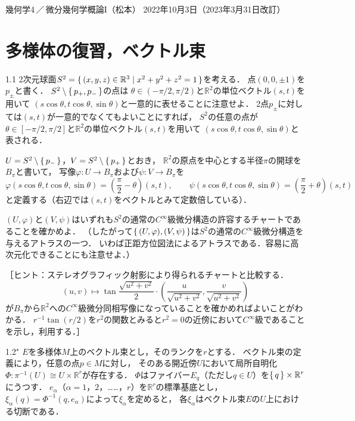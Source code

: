 \documentclass[uplatex,dvipdfmx,fontsize=12pt,jafontsize=11pt,line_length=42zw,number_of_lines=36,hanging_punctuation]{jlreq}
\begin{document}
\begin{flushleft}
	幾何学4\,／\,微分幾何学概論I（松本）
	\hfill
	2022年10月3日（2023年3月31日改訂）
\end{flushleft}
\section{多様体の復習，ベクトル束}

\begin{problems}
	\item[1.1]
		2次元球面$S^2=\set{(x,y,z)\in\mathbb{R}^3|x^2+y^2+z^2=1}$を考える．
		点$(0,0,\pm 1)$を$p_\pm$と書く．
		$S^2\setminus\set{p_+,p_-}$の点は
		$\theta\in(-\pi/2,\pi/2)$と$\mathbb{R}^2$の単位ベクトル$(s,t)$を用いて
		$(s\cos\theta,t\cos\theta,\sin\theta)$と一意的に表せることに注意せよ．
		2点$p_\pm$に対しては$(s,t)$が一意的でなくてもよいことにすれば，
		$S^2$の任意の点が$\theta\in[-\pi/2,\pi/2]$と$\mathbb{R}^2$の単位ベクトル$(s,t)$を用いて
		$(s\cos\theta,t\cos\theta,\sin\theta)$と表される．

		$U=S^2\setminus\set{p_-}$，$V=S^2\setminus\set{p_+}$とおき，
		$\mathbb{R}^2$の原点を中心とする半径$\pi$の開球を$B_\pi$と書いて，
		写像$\varphi\colon U\to B_\pi$および$\psi\colon V\to B_\pi$を
		\begin{equation}
			\varphi(s\cos\theta,t\cos\theta,\sin\theta)=\left(\frac{\pi}{2}-\theta\right)(s,t),\qquad
			\psi(s\cos\theta,t\cos\theta,\sin\theta)=\left(\frac{\pi}{2}+\theta\right)(s,t)
		\end{equation}
		と定義する（右辺では$(s,t)$をベクトルとみて定数倍している）．

		$(U,\varphi)$と$(V,\psi)$はいずれも$S^2$の通常の$C^\infty$級微分構造の許容するチャートであることを確かめよ．
		（したがって$\set{(U,\varphi),(V,\psi)}$は$S^2$の通常の$C^\infty$級微分構造を与えるアトラスの一つ．
		いわば正距方位図法によるアトラスである．容易に高次元化できることにも注意せよ．）

		［ヒント：ステレオグラフィック射影により得られるチャートと比較する．
		\begin{equation}
			(u,v)\mapsto\tan\frac{\sqrt{u^2+v^2}}{2}\cdot
			\left(\frac{u}{\sqrt{u^2+v^2}},\frac{v}{\sqrt{u^2+v^2}}\right)
		\end{equation}
		が$B_\pi$から$\mathbb{R}^2$への$C^\infty$級微分同相写像になっていることを確かめればよいことがわかる．
		$r^{-1}\tan(r/2)$を$r^2$の関数とみると$r^2=0$の近傍において$C^\infty$級であることを示し，利用する．］
		\clearpage
	\item[1.2$^\star$]
		$E$を多様体$M$上のベクトル束とし，そのランクを$r$とする．
		ベクトル束の定義により，任意の点$p\in M$に対し，
		そのある開近傍$U$において局所自明化
		$\Phi\colon \pi^{-1}(U)\cong U\times\mathbb{R}^r$が存在する．
		$\Phi$はファイバー$E_q$（ただし$q\in U$）を$\set{q}\times\mathbb{R}^r$にうつす．
		$e_\alpha$（$\alpha=1$，$2$，……，$r$）を$\mathbb{R}^r$の標準基底とし，
		$\xi_\alpha(q)=\Phi^{-1}(q,e_\alpha)$によって$\xi_\alpha$を定めると，
		各$\xi_\alpha$はベクトル束$E$の$U$上における切断である．


\end{problems}
\end{document}
